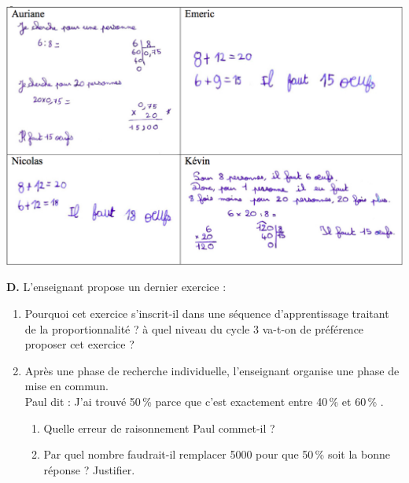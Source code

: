 \begin{exercice}[CRPE 2014 G2]
\begin{center}
   \includegraphics[width=15cm]{Transversal/Images/Tra8_analyse_mousse}
\end{center}
{\bf D.} L'enseignant propose un dernier exercice :
\begin{center}
\end{center}
\begin{enumerate}
   \item Pourquoi cet exercice s'inscrit-il dans une séquence d'apprentissage traitant de la proportionnalité ? à quel niveau du cycle 3 va-t-on de préférence proposer cet exercice ?
   \item Après une phase de recherche individuelle, l'enseignant organise une phase de mise en commun. \\
   Paul dit : \og J'ai trouvé 50\,\% parce que c'est exactement entre 40\,\% et 60\,\% \fg.
   \begin{enumerate}
      \item Quelle erreur de raisonnement Paul commet-il ?
      \item Par quel nombre faudrait-il remplacer 5000 pour que 50\,\% soit la bonne réponse ? Justifier.
   \end{enumerate}
\end{enumerate}
\end{exercice}

